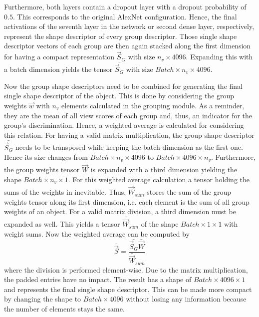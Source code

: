 Furthermore, both layers contain a dropout layer with a dropout probability of $0.5$.
This corresponds to the original AlexNet configuration.
Hence, the final activations of the seventh layer in the network or second dense layer, respectively, represent the shape descriptor of every group descriptor.
Those single shape descriptor vectors of each group are then again stacked along the first dimension for having a compact representation $\vec{S}_G$ with size $n_v \times 4096$.
Expanding this with a batch dimension yields the tensor $\bar{\vec{S}_G}$ with size $Batch \times n_v \times 4096$.

Now the group shape descriptors need to be combined for generating the final single shape descriptor of the object.
This is done by considering the group weights $\vec{w}$ with $n_v$ elements calculated in the grouping module.
As a reminder, they are the mean of all view scores of each group and, thus, an indicator for the group's discrimination.
Hence, a weighted average is calculated for considering this relation.
For having a valid matrix multiplication, the group shape descriptor $\bar{\vec{S}_G}$ needs to be transposed while keeping the batch dimension as the first one.
Hence its size changes from $Batch \times n_v \times 4096$ to $Batch \times 4096 \times n_v$.
Furthermore, the group weights tensor $\bar{\vec{W}}$ is expanded with a third dimension yielding the shape $Batch \times n_v \times 1$.
For this weighted average calculation a tensor holding the sums of the weights in inevitable.
Thus, $\bar{\vec{W}}_{sum}$ stores the sum of the group weights tensor along its first dimension, i.e. each element is the sum of all group weights of an object.
For a valid matrix division, a third dimension must be expanded as well.
This yields a tensor $\bar{\vec{W}}_{sum}$ of the shape $Batch \times 1 \times 1$ with weight sums.
Now the weighted average can be computed by
\begin{equation}
	\bar{\vec{S}} = \frac{\bar{\vec{S}_G} \bar{\vec{W}}}{\bar{\vec{W}}_{sum}}
\end{equation}
where the division is performed element-wise.
Due to the matrix multiplication, the padded entries have no impact.
The result has a shape of $Batch \times 4096 \times 1$ and represents the final single shape descriptor.
This can be made more compact by changing the shape to $Batch \times 4096$ without losing any information because the number of elements stays the same.


